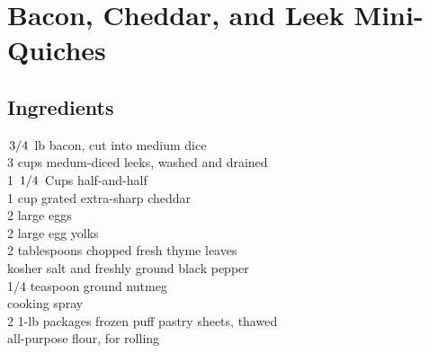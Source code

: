 \documentclass{article}
\begin{document}
\newcommand{\slfrac}[2]{\left.#1\middle/#2\right.}
\newcommand{\degree}{\ensuremath{^\circ}}

\section*{Bacon, Cheddar, and Leek Mini-Quiches}



\subsection*{Ingredients}
$\slfrac{3}{4}$ lb bacon, cut into medium dice\\
3 cups medum-diced leeks, washed and drained\\
1 $\slfrac{1}{4}$ Cups half-and-half\\
1 cup grated extra-sharp cheddar\\
2 large eggs\\
2 large egg yolks\\
2 tablespoons chopped fresh thyme leaves\\
kosher salt and freshly ground black pepper\\
1/4 teaspoon ground nutmeg\\
cooking spray\\
2 1-lb packages frozen puff pastry sheets, thawed\\
all-purpose flour, for rolling\\
\end{document}
